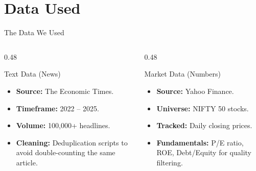 \documentclass[aspectratio=169, 10pt]{beamer}
\begin{document}
\section{Data Used}
\begin{frame}{The Data We Used}
    \begin{columns}[T]
        \begin{column}{0.48\textwidth}
            \begin{block}{Text Data (News)}
                \begin{itemize}
                    \item \textbf{Source:} The Economic Times.
                    \item \textbf{Timeframe:} 2022 -- 2025.
                    \item \textbf{Volume:} 100,000+ headlines.
                    \item \textbf{Cleaning:} Deduplication scripts to avoid double-counting the same article.
                \end{itemize}
            \end{block}
        \end{column}
        \begin{column}{0.48\textwidth}
            \begin{block}{Market Data (Numbers)}
                \begin{itemize}
                    \item \textbf{Source:} Yahoo Finance.
                    \item \textbf{Universe:} NIFTY 50 stocks.
                    \item \textbf{Tracked:} Daily closing prices.
                    \item \textbf{Fundamentals:} P/E ratio, ROE, Debt/Equity for quality filtering.
                \end{itemize}
            \end{block}
        \end{column}
    \end{columns}
\end{frame}

\end{document}
